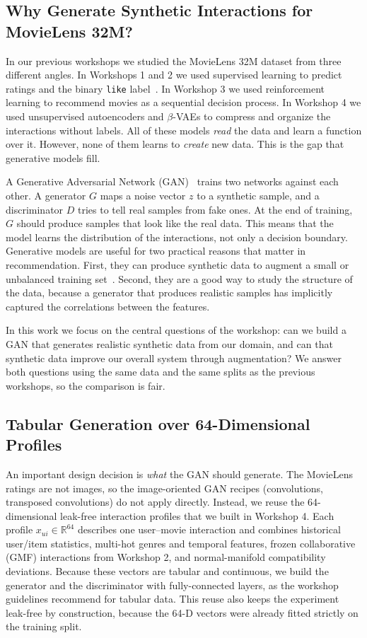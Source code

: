 \documentclass[10pt,twocolumn]{article}
\begin{document}
\subsection{Why Generate Synthetic Interactions for MovieLens 32M?}

In our previous workshops we studied the MovieLens 32M dataset from three different angles.
In Workshops 1 and 2 we used supervised learning to predict ratings and the binary
\texttt{like} label~\cite{koren2009,he2017}. In Workshop 3 we used reinforcement learning to
recommend movies as a sequential decision process. In Workshop 4 we used unsupervised
autoencoders and $\beta$-VAEs to compress and organize the interactions without labels.
All of these models \emph{read} the data and learn a function over it. However, none of them
learns to \emph{create} new data. This is the gap that generative models fill.

A Generative Adversarial Network (GAN)~\cite{goodfellow2014} trains two networks against each
other. A generator $G$ maps a noise vector $z$ to a synthetic sample, and a discriminator $D$
tries to tell real samples from fake ones. At the end of training, $G$ should produce samples
that look like the real data. This means that the model learns the distribution of the
interactions, not only a decision boundary. Generative models are useful for two practical
reasons that matter in recommendation. First, they can produce synthetic data to augment a
small or unbalanced training set~\cite{fridadar2018}. Second, they are a good way to study the
structure of the data, because a generator that produces realistic samples has implicitly
captured the correlations between the features.

In this work we focus on the central questions of the workshop: can we build a GAN that
generates realistic synthetic data from our domain, and can that synthetic data improve our
overall system through augmentation? We answer both questions using the same data and the
same splits as the previous workshops, so the comparison is fair.

\subsection{Tabular Generation over 64-Dimensional Profiles}

An important design decision is \emph{what} the GAN should generate. The MovieLens ratings are
not images, so the image-oriented GAN recipes (convolutions, transposed convolutions) do not
apply directly. Instead, we reuse the 64-dimensional leak-free interaction profiles that we
built in Workshop 4. Each profile $x_{ui}\in\mathbb{R}^{64}$ describes one user--movie
interaction and combines historical user/item statistics, multi-hot genres and temporal
features, frozen collaborative (GMF) interactions from Workshop 2, and normal-manifold
compatibility deviations. Because these vectors are tabular and continuous, we build the
generator and the discriminator with fully-connected layers, as the workshop guidelines
recommend for tabular data. This reuse also keeps the experiment leak-free by construction,
because the 64-D vectors were already fitted strictly on the training split.
\end{document}
